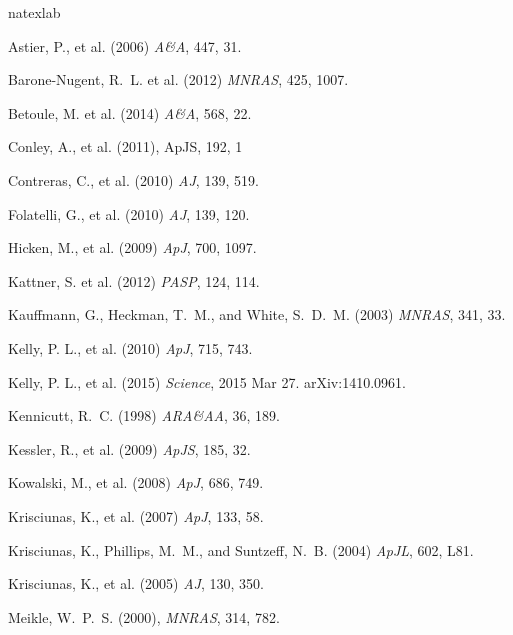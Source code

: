 \documentclass[11pt]{article}
\begin{document}
\clearpage
\begin{thebibliography}{11}
\expandafter\ifx\csname natexlab\endcsname\relax\def\natexlab#1{#1}\fi

{Astier}, P., et al. (2006) {\it A\&A}, 447, 31.

{Barone-Nugent}, R.~L. et al. (2012) {\it MNRAS}, 425, 1007.

{Betoule}, M. et al. (2014) {\it A\&A}, 568, 22.

%

{Conley}, A., et al. (2011), ApJS, 192, 1

{Contreras}, C., et al. (2010) {\it AJ}, 139, 519.

{Folatelli}, G., et al. (2010) {\it AJ}, 139, 120.

{Hicken}, M., et al. (2009) {\it ApJ}, 700, 1097.

{Kattner}, S. et al. (2012) {\it PASP}, 124, 114.

{Kauffmann}, G., {Heckman}, T.~M., and White, S.~D.~M. (2003) {\it MNRAS}, 341, 33.

{Kelly}, P. L., et al. (2010) {\it ApJ}, 715, 743.

{Kelly}, P. L., et al. (2015) {\it Science}, 2015 Mar 27. arXiv:1410.0961.

{Kennicutt}, R.~C. (1998) {\it ARA\&AA}, 36, 189.

{Kessler}, R., et al. (2009) {\it ApJS}, 185, 32.

{Kowalski}, M., et al. (2008) {\it ApJ}, 686, 749.

{Krisciunas}, K., et al. (2007) {\it ApJ}, 133, 58.

{Krisciunas}, K., {Phillips}, M.~M., and {Suntzeff}, N.~B. (2004) {\it ApJL}, 602, L81.

{Krisciunas}, K., et al. (2005) {\it AJ}, 130, 350.

{Meikle}, W.~P.~S. (2000), {\it MNRAS}, 314, 782.



\end{thebibliography}
\end{document}
